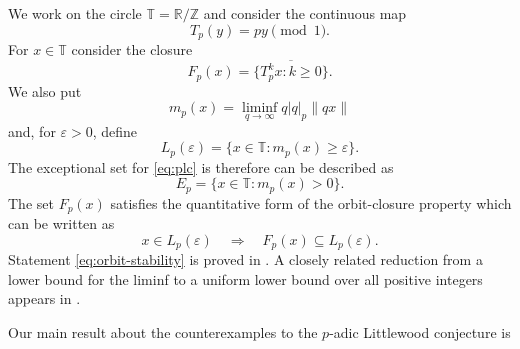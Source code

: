 \documentclass[11pt]{article}
\theoremstyle{remark}
\newcommand{\T}{\mathbb{T}}
\newcommand{\Fp}{F_p}
\newcommand{\Lp}{L_p}
\newcommand{\mpc}{m_p}
\newcommand{\vp}[1]{{\color{red}  {#1}}}
\begin{document}
We work on the circle $\T=\mathbb R/\mathbb Z$ and consider the continuous
map
\begin{equation} \label{eq:map}
    T_p(y)=py\pmod 1.
\end{equation}
For $x\in\T$ consider the closure
\begin{equation}  \label{eq:orbit-closure}
    \Fp(x)=\overline{\{T_p^k x:k\geq 0\}}.
\end{equation}
We also put
\begin{equation} \label{eq:mp}
    \mpc(x)=\liminf_{q\to\infty}q|q|_p\|qx\|
\end{equation}
and, for $\varepsilon>0$, define
\begin{equation} \label{eq:Lpepsilon}
    \Lp(\varepsilon)
    =\{x\in\T:\mpc(x)\geq\varepsilon\}.
\end{equation}
The exceptional set for \eqref{eq:plc} is therefore can be described
as
\begin{equation} \label{eq:exceptional-set}
    E_p=\{x\in\T:\mpc(x)>0\}.
\end{equation}
The set $F_p(x)$ satisfies the quantitative form of the
orbit-closure property which can be written as
\begin{equation} \label{eq:orbit-stability}
    x\in\Lp(\varepsilon)
    \quad\Longrightarrow\quad
    \Fp(x)\subseteq\Lp(\varepsilon).
\end{equation}
Statement \eqref{eq:orbit-stability} is proved in
\cite[Lemma~3.1]{BlackmanKristensenNorthey2024}.  A closely related reduction
from a lower bound for the liminf to a uniform lower bound over all positive
integers appears in \cite[Lemma~1]{Badziahin2026}.


Our main result about the counterexamples to the $p$-adic Littlewood
conjecture is
\end{document}
